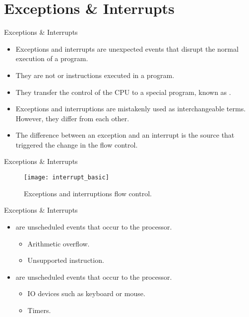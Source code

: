 \section{Exceptions \& Interrupts}
% 
\begin{frame}{Exceptions \& Interrupts}{}
\begin{itemize}
\item Exceptions and interrupts are unexpected events that disrupt the normal execution of a program. 
\item They are not  or  instructions executed in a program. 
\item They transfer the control of the \ac{CPU} to a special program, known as .
\item Exceptions and interruptions are mistakenly used as interchangeable terms. However, they differ from each other.
\item The difference between an exception and an interrupt is the source that triggered the change in the flow control. 
\end{itemize}
\end{frame} 

% 
\begin{frame}{Exceptions \& Interrupts}{}
\begin{figure}
\centering
\texttt{[image: interrupt\_basic]}
\caption{Exceptions and interruptions flow control.}
\label{Figure:Interruption_basic}
\end{figure}
\end{frame}

% 
\begin{frame}{Exceptions \& Interrupts}{}
\begin{itemize}
\item {} are  unscheduled events that occur  to the processor.
\pauseprint
  \begin{itemize}
  \item Arithmetic overflow.
  \item Unsupported instruction.
  \end{itemize}
\pauseprint
\item {} are  unscheduled events that occur  to the processor.
\pauseprint
  \begin{itemize}
  \item \ac{IO} devices such as keyboard or mouse.
  \item Timers.
  \end{itemize}
\end{itemize}
\end{frame} 

